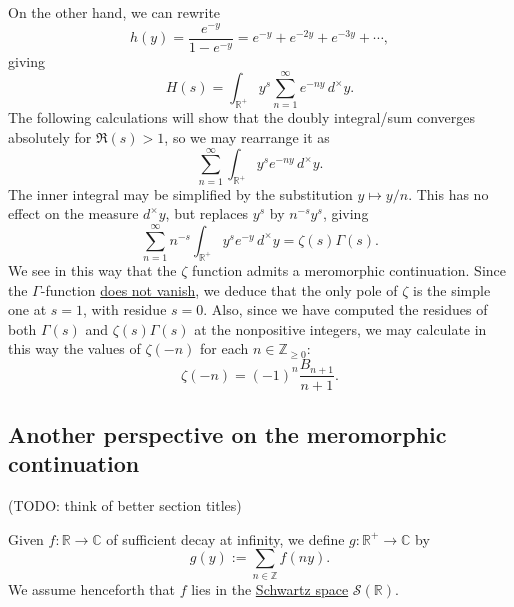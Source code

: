 \documentclass[reqno]{amsart}  \numberwithin{theorem}{section} \numberwithin{equation}{section}
\begin{document}
On the other hand, we can rewrite
\begin{equation*}
  h(y) = \frac{e^{- y}}{ 1 - e^{- y}}
  = e^{- y } + e^{- 2 y } + e^{- 3 y} + \dotsb,
\end{equation*}
giving
\begin{equation*}
  H(s) = \int_{\mathbb{R}^+ } y^s \sum_{n = 1 }^\infty e^{- n y } \,d^\times y.
\end{equation*}
The following calculations will show that the doubly integral/sum converges absolutely for $\Re(s) > 1$, so we may rearrange it as
\begin{equation*}
  \sum_{n = 1 }^\infty \int_{\mathbb{R}^+ } y^s e^{- n y } \,d^\times y.
\end{equation*}
The inner integral may be simplified by the substitution $y \mapsto y /n$.  This has no effect on the measure $d^\times y$, but replaces $y^s$ by $n^{-s} y^s$, giving
\begin{equation*}
  \sum_{n = 1 }^\infty n^{- s} \int_{\mathbb{R}^+ } y^s e^{- y } \,d^\times y
  = \zeta(s) \Gamma(s).
\end{equation*}
We see in this way that the $\zeta$ function admits a meromorphic continuation.  Since the $\Gamma$-function \href{https://www.proofwiki.org/wiki/Zeroes_of_Gamma_Function}{does not vanish}, we deduce that the only pole of $\zeta$ is the simple one at $s=1$, with residue $s=0$.  Also, since we have computed the residues of both $\Gamma(s)$ and $\zeta(s) \Gamma(s)$ at the nonpositive integers, we may calculate in this way the values of $\zeta(-n)$ for each $n \in \mathbb{Z}_{\geq 0}$:
\begin{equation*}
  \zeta(-n) = (-1)^n \frac{B_{n + 1}}{ n + 1}.
\end{equation*}

\subsection{Another perspective on the meromorphic continuation}\label{sec:cj4vkkark8}
(TODO: think of better section titles)

Given $f : \mathbb{R} \rightarrow \mathbb{C}$ of sufficient decay at infinity, we define $g : \mathbb{R}^+ \rightarrow \mathbb{C} $ by
\begin{equation*}
g(y) := \sum_{n \in \mathbb{Z} } f(n y).
\end{equation*}
We assume henceforth that $f$ lies in the \href{https://en.wikipedia.org/wiki/Schwartz_space}{Schwartz space} $\mathcal{S}(\mathbb{R})$.
\end{document}
